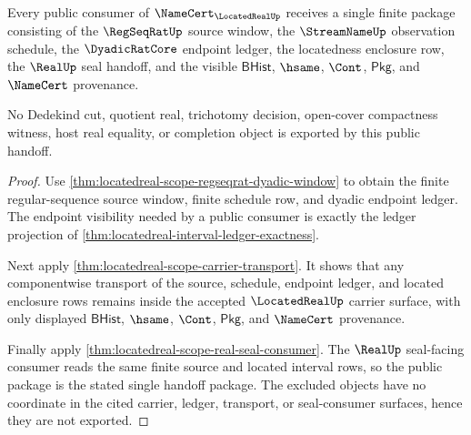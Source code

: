 \begin{theorem}
\label{thm:locatedreal-public-regseqrat-interval-handoff}
Every public consumer of $\NameCert_{\LocatedRealUp}$ receives a single finite package consisting of the $\RegSeqRatUp$ source window, the $\StreamNameUp$ observation schedule, the $\DyadicRatCore$ endpoint ledger, the locatedness enclosure row, the $\RealUp$ seal handoff, and the visible $\mathsf{BHist}$, $\hsame$, $\Cont$, $\mathsf{Pkg}$, and $\NameCert$ provenance.

No Dedekind cut, quotient real, trichotomy decision, open-cover compactness witness, host real equality, or completion object is exported by this public handoff.
\end{theorem}
\begin{proof}
Use \autoref{thm:locatedreal-scope-regseqrat-dyadic-window} to obtain the finite regular-sequence source window, finite schedule row, and dyadic endpoint ledger. The endpoint visibility needed by a public consumer is exactly the ledger projection of \autoref{thm:locatedreal-interval-ledger-exactness}.

Next apply \autoref{thm:locatedreal-scope-carrier-transport}. It shows that any componentwise transport of the source, schedule, endpoint ledger, and located enclosure rows remains inside the accepted $\LocatedRealUp$ carrier surface, with only displayed $\mathsf{BHist}$, $\hsame$, $\Cont$, $\mathsf{Pkg}$, and $\NameCert$ provenance.

Finally apply \autoref{thm:locatedreal-scope-real-seal-consumer}. The $\RealUp$ seal-facing consumer reads the same finite source and located interval rows, so the public package is the stated single handoff package. The excluded objects have no coordinate in the cited carrier, ledger, transport, or seal-consumer surfaces, hence they are not exported.
\end{proof}

